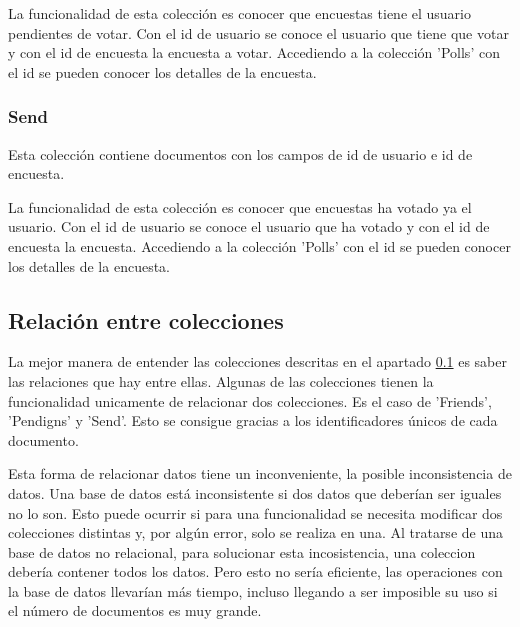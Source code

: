 \documentclass[a4paper, 12pt]{book}
\begin{document}
La funcionalidad de esta colecci\'on es conocer que encuestas tiene el usuario pendientes de votar. Con el id de usuario se conoce el usuario que tiene que votar y con el id de encuesta la encuesta a votar. Accediendo a la colecci\'on 'Polls' con el id se pueden conocer los detalles de la encuesta.

\subsubsection{Send} 
\label{sec:c_send}

Esta colecci\'on contiene documentos con los campos de id de usuario e id de encuesta.

La funcionalidad de esta colecci\'on es conocer que encuestas ha votado ya el usuario. Con el id de usuario se conoce el usuario que ha votado y con el id de encuesta la encuesta. Accediendo a la colecci\'on 'Polls' con el id se pueden conocer los detalles de la encuesta.


\subsection{Relaci\'on entre colecciones} 
\label{sec:colecciones}

La mejor manera de entender las colecciones descritas en el apartado \ref{sec:colecciones} es saber las relaciones que hay entre ellas. Algunas de las colecciones tienen la funcionalidad unicamente de relacionar dos colecciones. Es el caso de 'Friends', 'Pendigns' y 'Send'. Esto se consigue gracias a los identificadores \'unicos de cada documento.

Esta forma de relacionar datos tiene un inconveniente, la posible inconsistencia de datos. Una base de datos est\'a inconsistente si dos datos que deber\'ian ser iguales no lo son. Esto puede ocurrir si para una funcionalidad se necesita modificar dos colecciones distintas y, por alg\'un error, solo se realiza en una. Al tratarse de una base de datos no relacional, para solucionar esta incosistencia, una coleccion deber\'ia contener todos los datos. Pero esto no ser\'ia eficiente, las operaciones con la base de datos llevar\'ian m\'as tiempo, incluso llegando a ser imposible su uso si el n\'umero de documentos es muy grande.
\end{document}
